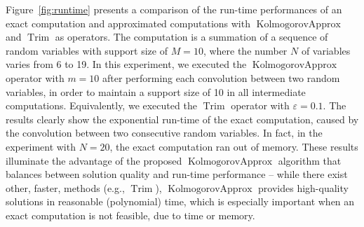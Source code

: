 \documentclass{article}
\DeclareMathOperator{\Trim}{Trim}
\DeclareMathOperator{\OptTrim}{KolmogorovApprox}
\begin{document}
Figure~\ref{fig:runtime} presents a comparison of the run-time performances of an exact computation and approximated computations with $\OptTrim$ and $\Trim$ as operators. The computation is a summation of a sequence of random variables with support size of $M{=}10$, where the number $N$ of variables varies from 6 to 19. In this experiment, we executed the $\OptTrim$ operator with $m{=}10$ after performing each convolution between two random variables, in order to maintain a support size of 10 in all intermediate computations. 
Equivalently, we executed the $\Trim$ operator with $\varepsilon=0.1$.
The results clearly show the exponential run-time of the exact computation, caused by the convolution between two consecutive random variables. In fact, in the experiment with $N{=}20$, the exact computation ran out of memory. These results illuminate the advantage of the proposed $\OptTrim$ algorithm that balances between solution quality and run-time performance -- while there exist other, faster, methods (e.g., $\Trim$), $\OptTrim$ provides high-quality solutions in reasonable (polynomial) time, which is especially important when an exact computation is not feasible, due to time or memory.
\end{document}
